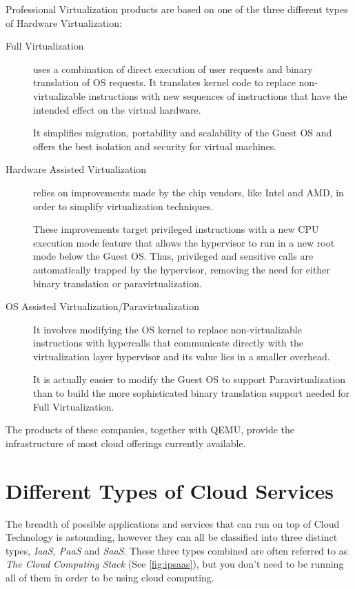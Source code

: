 Professional Virtualization products are based on one of the three different types of Hardware Virtualization:
\begin{description}
\item[Full Virtualization] uses a combination of direct execution of user requests and binary translation of \ac{OS} requests. It translates kernel code to replace non-virtualizable instructions with new sequences of instructions that have the intended effect on the virtual hardware.

It simplifies migration, portability and scalability of the Guest \ac{OS} and offers the best isolation and security for virtual machines.
\cite[p. 4]{vmware:2007}

\item[Hardware Assisted Virtualization] relies on improvements made by the chip vendors, like Intel and AMD, in order to simplify virtualization techniques.

These improvements target privileged instructions with a new CPU execution mode feature that allows the hypervisor to run in a new root mode below the Guest \ac{OS}. Thus, privileged and sensitive calls are automatically trapped by the hypervisor, removing the need for either binary translation or
paravirtualization.
\cite[p. 6]{vmware:2007}

\item[OS Assisted Virtualization/Paravirtualization] It involves modifying the OS kernel to replace non-virtualizable instructions with hypercalls that communicate directly with the virtualization layer hypervisor and its value lies in a smaller overhead.

It is actually easier to modify the Guest \ac{OS} to support Paravirtualization than to build the more sophisticated binary translation support needed for Full Virtualization.
\cite[p. 5]{vmware:2007}
\end{description}


The products of these companies, together with \textsc{QEMU}, provide the infrastructure of most cloud offerings currently available.    

\section{Different Types of Cloud Services}
The breadth of possible applications and services that can run on top of Cloud Technology is astounding, however they can all be classified into three distinct types, \textit{\ac{IaaS}, \ac{PaaS}} and \textit{\ac{SaaS}}. These three types combined are often referred to as \textit{The Cloud Computing Stack} (See \autoref{fig:ipsaas}), but you don't need to be running all of them in order to be using cloud computing.
\cite[p. 8]{mcgrath:2012}  

